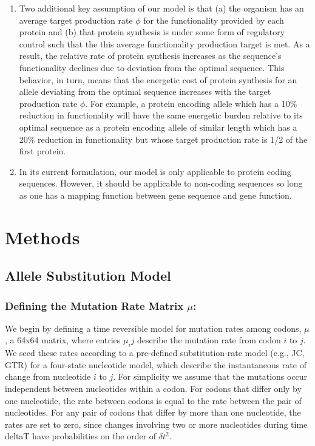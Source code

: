 \documentclass{article}
\begin{document}
\begin{enumerate}
\item Two additional key assumption of our model is that (a) the organism has an average target production rate $\phi$ for the functionality provided by each protein and (b) that protein synthesis is under some form of  regulatory control such that the this average functionality production target is met.
As a result, the relative rate of protein synthesis increases as the sequence's functionality declines due to deviation from the optimal sequence.
This behavior, in turn, means that the energetic cost of protein synthesis for an allele deviating from the optimal sequence increases with the target production rate $\phi$.
For example, a protein encoding allele which has a 10\% reduction in functionality will have the same energetic burden relative to its optimal sequence as a protein encoding allele of similar length which has a 20\% reduction in functionality but whose target production rate is 1/2 of the first protein.
\item In its current formulation, our model is only applicable to protein coding sequences.
However, it should be applicable to non-coding sequences so long as one has a mapping function between gene sequence and gene function.
\end{enumerate}




\section*{Methods}
\subsection*{Allele Substitution Model}
\subsubsection*{Defining the Mutation Rate Matrix $\mu$: }
We begin by defining a time reversible model for mutation rates among codons, $\mu$, a 64x64 matrix, where entries $\mu_ij$ describe the mutation rate from codon $i$ to $j$.
We seed these rates according to a pre-defined substitution-rate model (e.g., JC, GTR) for a four-state nucleotide model, which describe the instantaneous rate of change from nucleotide $i$ to $j$.
For simplicity we assume that the mutations occur independent between nucleotides within a codon. 
For codons that differ only by one nucleotide, the rate between codons is equal to the rate between the pair of nucleotides.
For any pair of codons that differ by more than one nucleotide, the rates are set to zero, since changes involving two or more nucleotides during time deltaT have probabilities on the order of $\delta t^2$. 
\end{document}
